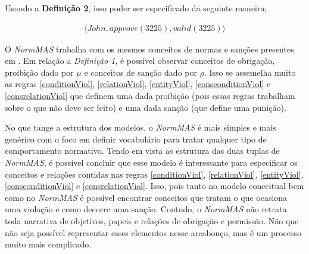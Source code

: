 Usando a \textbf{Definição 2}, isso poder ser especificado da seguinte maneira; 

\begin{eqnarray} 
    \langle John, approve(3225), valid(3225)\rangle
\end{eqnarray}

O \textit{NormMAS} trabalha com os mesmos conceitos de normas e sanções presentes em \cite{dastaniframework}. Em relação a \textit{Definição 1}, é possível observar conceitos de obrigação, proibição dado por $ \mu $ e conceitos de sanção dado por $\rho$. Isso se assemelha muito as regras \ref{conditionViol}, \ref{relationViol}, \ref{entityViol}, \ref{consconditionViol} e \ref{consrelationViol} que definem uma dada proibição (pois essas regras trabalham sobre o que não deve ser feito) e uma dada sanção (que define uma punição).

No que tange a estrutura dos modelos, o \textit{NormMAS} é mais simples e mais genérico com o foco em definir vocabulário para tratar qualquer tipo de comportamento normativo. Tendo em vista as estrutura das duas tuplas de \textit{NormMAS}, é possível concluir que esse modelo é interessante para especificar os conceitos e relações contidas nas regras \ref{conditionViol}, \ref{relationViol}, \ref{entityViol}, \ref{consconditionViol} e \ref{consrelationViol}. Isso, pois tanto no modelo conceitual bem como no \textit{NormMAS} é possível encontrar conceitos que tratam o que ocasiona uma violação e como decorre uma sanção. Contudo, o \textit{NormMAS} não retrata toda narrativa de objetivos, papeis e relações de obrigação e permissão. Não que não seja possível representar esses elementos nesse arcabouço, mas é um processo muito mais complicado.  